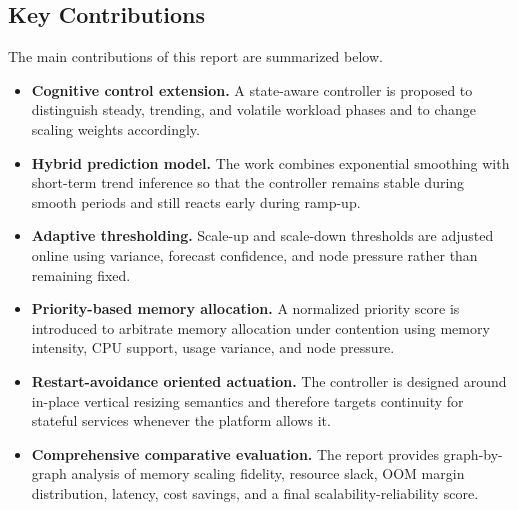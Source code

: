 \documentclass[12pt,a4paper]{article}
\begin{document}
\subsection{Key Contributions}

The main contributions of this report are summarized below.
\begin{itemize}
    \item \textbf{Cognitive control extension.} A state-aware controller is proposed to distinguish steady, trending, and volatile workload phases and to change scaling weights accordingly.
    \item \textbf{Hybrid prediction model.} The work combines exponential smoothing with short-term trend inference so that the controller remains stable during smooth periods and still reacts early during ramp-up.
    \item \textbf{Adaptive thresholding.} Scale-up and scale-down thresholds are adjusted online using variance, forecast confidence, and node pressure rather than remaining fixed.
    \item \textbf{Priority-based memory allocation.} A normalized priority score is introduced to arbitrate memory allocation under contention using memory intensity, CPU support, usage variance, and node pressure.
    \item \textbf{Restart-avoidance oriented actuation.} The controller is designed around in-place vertical resizing semantics and therefore targets continuity for stateful services whenever the platform allows it.
    \item \textbf{Comprehensive comparative evaluation.} The report provides graph-by-graph analysis of memory scaling fidelity, resource slack, OOM margin distribution, latency, cost savings, and a final scalability-reliability score.
\end{itemize}
\end{document}
